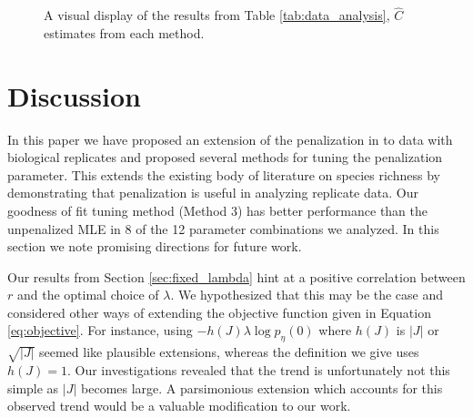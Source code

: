 \documentclass[oupdraft]{bio}
\begin{document}
\begin{figure}[t]
\caption{A visual display of the results from Table \ref{tab:data_analysis}, $\widehat{C}$ estimates from each method.
\label{fig:data_analysis}}
\centering{}
\end{figure}

\noindent {}



\section{Discussion}
\label{sec:discussion}

In this paper we have proposed an extension of the penalization in \citet{wang_2005} to data with biological replicates and proposed several methods for tuning the penalization parameter.  This extends the existing body of literature on species richness by demonstrating that penalization is useful in analyzing replicate data.  Our goodness of fit tuning method (Method 3) has better performance than the unpenalized MLE in 8 of the 12 parameter combinations we analyzed.  In this section we note promising directions for future work.{}

Our results from Section \ref{sec:fixed_lambda} hint at a positive correlation between $r$ and the optimal choice of $\lambda$.  We hypothesized that this may be the case and considered other ways of extending the objective function given in Equation \eqref{eq:objective}.  For instance, using $-h(J)\lambda \log p_{\eta}(0)$ where $h(J)$ is $|J|$ or $\sqrt{|J|}$ seemed like plausible extensions, whereas the definition we give uses $h(J) = 1$.  Our investigations revealed that the trend is unfortunately not this simple as $|J|$ becomes large.  A parsimonious extension which accounts for this observed trend would be a valuable modification to our work.
\end{document}

